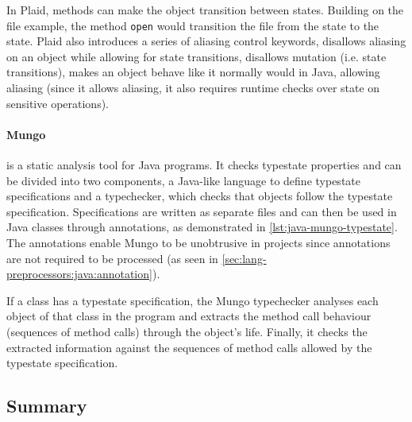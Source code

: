 In Plaid, methods can make the object transition between states. Building on the file example,
the method \texttt{open} would transition the file from the  state to the  state.
Plaid also introduces a series of aliasing control keywords,
 disallows aliasing on an object while allowing for state transitions,
 disallows mutation (i.e. state transitions),
 makes an object behave like it normally would in Java,
allowing aliasing (since it allows aliasing, it also requires runtime checks over state on sensitive operations).

\paragraph{Mungo} is a static analysis tool \autocite{Kouzapas2018, Voinea2020} for Java programs.
It checks typestate properties and can be divided into two components, a Java-like language to define typestate specifications
and a typechecker, which checks that objects follow the typestate specification.
Specifications are written as separate files and can then be used in Java classes through annotations, as demonstrated in \autoref{lst:java-mungo-typestate}.
The annotations enable Mungo to be unobtrusive in projects since annotations are not required to be processed (as seen in \autoref{sec:lang-preprocessors:java:annotation}).
\begin{displayquote}
	If a class has a typestate specification, the Mungo typechecker analyses each object of that class in the program and extracts the method call behaviour (sequences of method calls) through
	the object’s life. Finally, it checks the extracted information against the sequences of method calls allowed by the typestate specification.
\end{displayquote}



\subsection{Summary}

